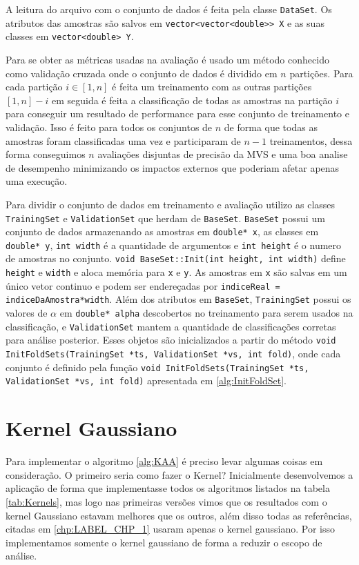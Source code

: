 
A leitura do arquivo com o conjunto de dados é feita pela classe \texttt{DataSet}. Os atributos das amostras são salvos em \texttt{vector<vector<double>> X} e as suas classes em \texttt{vector<double> Y}.

Para se obter as métricas usadas na avaliação é usado um método conhecido como validação cruzada onde o conjunto de dados é dividido em $n$ partições. Para cada partição $i \in [1,n]$ é feita um treinamento com as outras partições $[1,n]-i$ em seguida é feita a classificação de todas as amostras na partição $i$ para conseguir um resultado de performance para esse conjunto de treinamento e validação. Isso é feito para todos os conjuntos de $n$ de forma que todas as amostras foram classificadas uma vez e participaram de $n-1$ treinamentos, dessa forma conseguimos $n$ avaliações disjuntas de precisão da MVS e uma boa analise de desempenho minimizando os impactos externos que poderiam afetar apenas uma execução.

Para dividir o conjunto de dados em treinamento e avaliação utilizo as classes \texttt{TrainingSet} e \texttt{ValidationSet} que herdam de \texttt{BaseSet}. \texttt{BaseSet} possui um conjunto de dados armazenando as amostras em \texttt{double* x}, as classes em \texttt{double* y}, \texttt{int width} é a quantidade de argumentos e \texttt{int height} é o numero de amostras no conjunto. \texttt{void BaseSet::Init(int height, int width)} define \texttt{height} e \texttt{width} e aloca memória para \texttt{x} e \texttt{y}. As amostras em \texttt{x} são salvas em um único vetor continuo e podem ser endereçadas por \texttt{indiceReal = indiceDaAmostra*width}.
Além dos atributos em \texttt{BaseSet}, \texttt{TrainingSet} possui os valores de $\alpha$ em \texttt{double* alpha} descobertos no treinamento para serem usados na classificação, e \texttt{ValidationSet} mantem a quantidade de classificações corretas para análise posterior.
Esses objetos são inicializados a partir do método \texttt{void InitFoldSets(TrainingSet *ts, ValidationSet *vs, int fold)}, onde cada conjunto é definido pela função \texttt{void InitFoldSets(TrainingSet *ts, ValidationSet *vs, int fold)} apresentada em \ref{alg:InitFoldSet}.


\section{Kernel Gaussiano}
Para implementar o algoritmo \ref{alg:KAA} é preciso levar algumas coisas em consideração. O primeiro seria como fazer o Kernel? Inicialmente desenvolvemos a aplicação de forma que implementasse todos os algoritmos listados na tabela \ref{tab:Kernels}, mas logo nas primeiras versões vimos que os resultados com o kernel Gaussiano estavam melhores que os outros, além disso todas as referências, citadas em \ref{chp:LABEL_CHP_1} usaram apenas o kernel gaussiano. Por isso implementamos somente o kernel gaussiano de forma a reduzir o escopo de análise.

